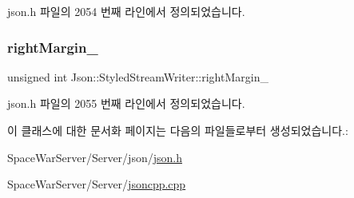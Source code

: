 json.\+h 파일의 2054 번째 라인에서 정의되었습니다.

\mbox{\label{class_json_1_1_styled_stream_writer_a94299ec0a9bb925b2dbbab7c1f2b390a}} 
\subsubsection{\texorpdfstring{right\+Margin\+\_\+}{rightMargin\_}}
{\footnotesize\ttfamily unsigned int Json\+::\+Styled\+Stream\+Writer\+::right\+Margin\+\_\+\hspace{0.3cm}{\ttfamily [private]}}



json.\+h 파일의 2055 번째 라인에서 정의되었습니다.



이 클래스에 대한 문서화 페이지는 다음의 파일들로부터 생성되었습니다.\+:\begin{DoxyCompactItemize}
\item 
Space\+War\+Server/\+Server/json/\hyperlink{json_8h}{json.\+h}\item 
Space\+War\+Server/\+Server/\hyperlink{jsoncpp_8cpp}{jsoncpp.\+cpp}\end{DoxyCompactItemize}
